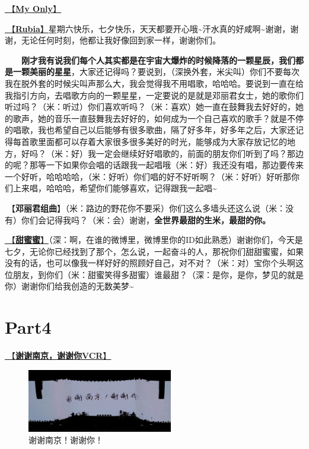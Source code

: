 \documentclass[]{ctexbook}
\begin{document}
\hyperref[my-only]{🎵【\textbf{My Only}】}

\hyperref[rubia]{🎵【\textbf{Rubia}】}星期六快乐，七夕快乐，天天都要开心哦\textasciitilde 汗水真的好咸啊\textasciitilde 谢谢，谢谢，无论任何时刻，他都让我好像回到家一样，谢谢你们。

  \textbf{刚才我有说我们每个人其实都是在宇宙大爆炸的时候降落的一颗星辰，我们都是一颗美丽的星星}，大家还记得吗？要说到，（深换外套，米尖叫）你们不要每次我在脱外套的时候尖叫声那么大，我会觉得我不用唱歌，哈哈哈。要说到一直在给我指引方向，去唱歌方向的一颗星星，一定要说的是就是邓丽君女士，她的歌你们听过吗？（米：听过）你们喜欢听吗？（米：喜欢）她一直在鼓舞我去好好的，她的歌声，她的音乐一直鼓舞我去好好的，如何成为一个自己喜欢的歌手？就是不停的唱歌，我也希望自己以后能够有很多歌曲，隔了好多年，好多年之后，大家还记得每首歌里面都可以存着大家很多很多美好的时光，能够成为大家存放记忆的地方，好吗？（米：好）我一定会继续好好唱歌的，前面的朋友你们听到了吗？那边的呢？那等一下如果你会唱的话跟我一起唱哦（米：好）我还没有唱，那边要传来一个好听，哈哈哈哈，（米：好听）你们唱的好不好听啊？（米：好听）好听那你们上来唱，哈哈哈，希望你们能够喜欢，记得跟我一起唱\textasciitilde{}

🎵【\textbf{邓丽君组曲}】（米：路边的野花你不要采）你们这么多墙头还这么说（米：没有）你们会记得我吗？（米：会）谢谢，\textbf{全世界最甜的生米，最甜的你。}

\hyperref[sweet]{🎵【\textbf{甜蜜蜜}】}（深：啊，在谁的微博里，微博里你的ID如此熟悉）谢谢你们，今天是七夕，无论你已经找到了那个，怎么说，一起奋斗的人，那祝你们甜甜蜜蜜，如果没有的话，也可以像我一样好好的照顾好自己，对不对？（米：对）宝你个头啊这位朋友，到你们（米：甜蜜笑得多甜蜜）谁最甜？（深：是你，是你，梦见的就是你）谢谢你们给我创造的无数美梦\textasciitilde{}

\section{Part4}\label{nanjing-20240810-part4}

\hyperref[thank-you-vcr]{🎥【\textbf{谢谢南京，谢谢你VCR}】}

\begin{figure}

{\centering \includegraphics[width=180pt]{img/nanjing20240810/thank-nanjing} 

}

\caption{谢谢南京！谢谢你！}\label{fig:unnamed-chunk-61}
\end{figure}
\end{document}
